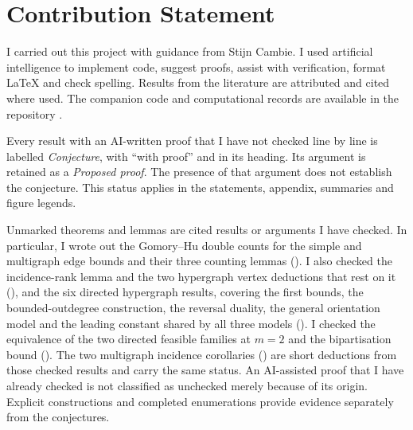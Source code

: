 \chapter*{Contribution Statement}
I carried out this project with guidance from Stijn Cambie. I used artificial
intelligence to implement code, suggest proofs, assist with verification,
format \LaTeX{} and check spelling. Results from the literature are attributed
and cited where used. The companion code and computational records are
available in the repository \cite{vandenbruwaene_thesis}.

Every result with an AI-written proof that I have not checked line by line is
labelled \emph{Conjecture}, with ``with proof'' and \aimedal{} in its heading.
Its argument is retained as a \emph{Proposed proof}. The presence of that
argument does not establish the conjecture. This status applies
in the statements, appendix, summaries and figure legends.

Unmarked theorems and lemmas are cited results or arguments I have checked.
In particular, I wrote out the Gomory--Hu double counts for the simple and
multigraph edge bounds and their three counting lemmas
().
I also checked the incidence-rank lemma and the two hypergraph vertex
deductions that rest on it
(),
and the six directed hypergraph results, covering the first bounds, the
bounded-outdegree construction, the reversal duality, the general orientation
model and the leading constant shared by all three models
().
I checked the equivalence of the two directed feasible families at $m = 2$
and the bipartisation bound
().
The two multigraph incidence corollaries
()
are short deductions from those checked results and carry the same status.
An AI-assisted proof that I have already checked is not classified as
unchecked merely because of its origin. Explicit constructions and completed
enumerations provide evidence separately from the conjectures.

